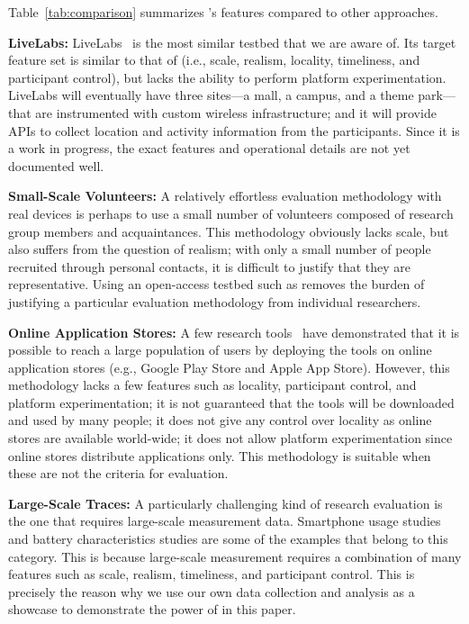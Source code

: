 Table~\ref{tab:comparison} summarizes \PhoneLab{}'s features compared to other
approaches.

{\bf LiveLabs:} LiveLabs~\cite{livelabs} is the most similar testbed that we are
aware of. Its target feature set is similar to that of \PhoneLab{} (i.e., scale,
realism, locality, timeliness, and participant control), but lacks the ability
to perform platform experimentation. LiveLabs will eventually have three
sites---a mall, a campus, and a theme park---that are instrumented with custom
wireless infrastructure; and it will provide APIs to collect location and
activity information from the participants. Since it is a work in progress, the
exact features and operational details are not yet documented well.

{\bf Small-Scale Volunteers:} A relatively effortless evaluation methodology
with real devices is perhaps to use a small number of volunteers composed of
research group members and acquaintances. This methodology obviously lacks
scale, but also suffers from the question of realism; with only a small number
of people recruited through personal contacts, it is difficult to justify that
they are representative. Using an open-access testbed such as \PhoneLab{}
removes the burden of justifying a particular evaluation methodology from
individual researchers.

{\bf Online Application Stores:} A few research tools~\cite{huang:mobisys:2010,
zhang:codes:2010} have demonstrated that it is possible to reach a large
population of users by deploying the tools on online application stores (e.g.,
Google Play Store and Apple App Store). However, this methodology lacks a few
features such as locality, participant control, and platform experimentation; it
is not guaranteed that the tools will be downloaded and used by many people; it
does not give any control over locality as online stores are available
world-wide; it does not allow platform experimentation since online stores
distribute applications only. This methodology is suitable when these are not
the criteria for evaluation.

{\bf Large-Scale Traces:} A particularly challenging kind of research evaluation
is the one that requires large-scale measurement data. Smartphone usage studies
and battery characteristics studies are some of the examples that belong to this
category. This is because large-scale measurement requires a combination of many
features such as scale, realism, timeliness, and participant control. This is
precisely the reason why we use our own data collection and analysis as a
showcase to demonstrate the power of \PhoneLab{} in this paper.

